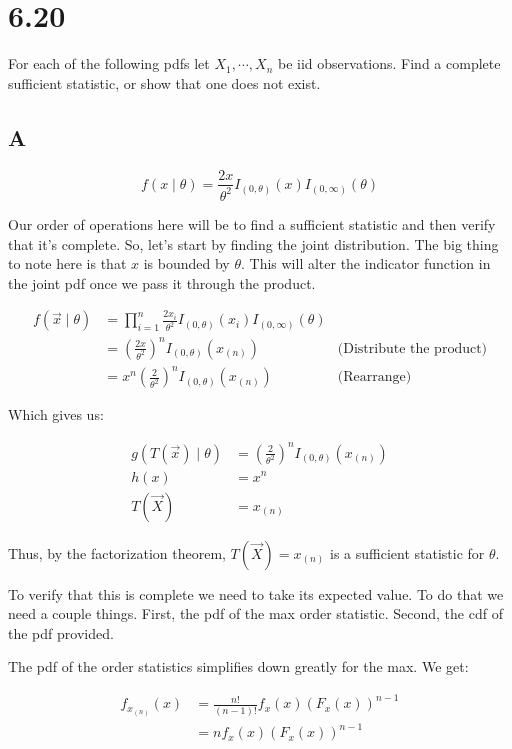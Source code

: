 \section*{6.20}

For each of the following pdfs let $X_1, \cdots, X_n$ be iid observations. Find a complete sufficient statistic, or show that one does not exist.

\subsection*{A}

\[
	f(x\mid\theta) = \frac{2x}{\theta^2} I_{(0, \theta)}(x) I_{(0, \infty)}(\theta)
\]

Our order of operations here will be to find a sufficient statistic and then verify that it's complete. So, let's start by finding the joint distribution. The big thing to note here is that $x$ is bounded by $\theta$. This will alter the indicator function in the joint pdf once we pass it through the product. 

\begin{align*}
	f(\vec{x} \mid \theta) &= \prod_{i=1}^n  \frac{2x_i}{\theta^2} I_{(0, \theta)}(x_i) I_{(0, \infty)}(\theta) \\
	&= \left( \frac{2x}{\theta^2} \right)^n I_{(0, \theta)}(x_{(n)}) & \text{(Distribute the product)} \\
	&= x^n \left( \frac{2}{\theta^2} \right)^n I_{(0, \theta)}(x_{(n)}) & \text{(Rearrange)}
\end{align*}

Which gives us:

\begin{align*}
	g(T(\vec{x}) \mid \theta) &= \left( \frac{2}{\theta^2} \right)^n I_{(0, \theta)}(x_{(n)}) \\
	h(x) &= x^n \\
	T(\vec{X}) &= x_{(n)}
\end{align*}

Thus, by the factorization theorem, $T(\vec{X}) = x_{(n)}$ is a sufficient statistic for $\theta$.

To verify that this is complete we need to take its expected value. To do that we need a couple things. First, the pdf of the max order statistic. Second, the cdf of the pdf provided. 

The pdf of the order statistics simplifies down greatly for the max. We get:

\begin{align*}
	f_{x_{(n)}}(x) &= \frac{n!}{(n-1)!} f_x(x) (F_x(x))^{n-1} \\
	&= n f_x(x) (F_x(x))^{n-1} 
\end{align*}

